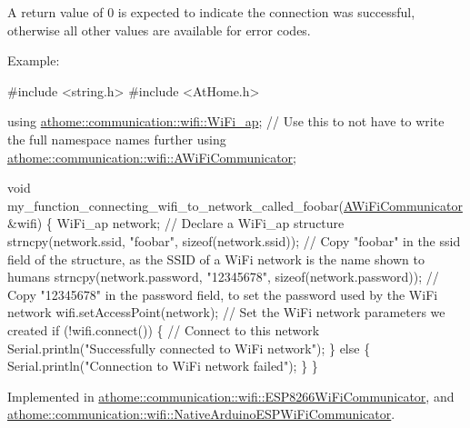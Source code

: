 A return value of 0 is expected to indicate the connection was successful, otherwise all other values are available for error codes.

Example\+:


\begin{DoxyCode}
\textcolor{preprocessor}{#include <string.h>}
\textcolor{preprocessor}{#include <AtHome.h>}

\textcolor{keyword}{using} \mbox{\hyperlink{structathome_1_1communication_1_1wifi_1_1s__wifi__access__point}{athome::communication::wifi::WiFi\_ap}}; \textcolor{comment}{// Use this to not have to
       write the full namespace names further}
\textcolor{keyword}{using} \mbox{\hyperlink{classathome_1_1communication_1_1wifi_1_1_a_wi_fi_communicator}{athome::communication::wifi::AWiFiCommunicator}};

\textcolor{keywordtype}{void} my\_function\_connecting\_wifi\_to\_network\_called\_foobar(\mbox{\hyperlink{classathome_1_1communication_1_1wifi_1_1_a_wi_fi_communicator_a0098148fe8d0eeee99b7f8f72a72a900}{AWiFiCommunicator}} &wifi) \{
  WiFi\_ap network; \textcolor{comment}{// Declare a WiFi\_ap structure}
  strncpy(network.ssid, \textcolor{stringliteral}{"foobar"}, \textcolor{keyword}{sizeof}(network.ssid)); \textcolor{comment}{// Copy "foobar" in the ssid field of the
       structure, as the SSID of a WiFi network is the name shown to humans}
  strncpy(network.password, \textcolor{stringliteral}{"12345678"}, \textcolor{keyword}{sizeof}(network.password)); \textcolor{comment}{// Copy "12345678" in the password
       field, to set the password used by the WiFi network}
  wifi.setAccessPoint(network); \textcolor{comment}{// Set the WiFi network parameters we created}
  \textcolor{keywordflow}{if} (!wifi.connect()) \{ \textcolor{comment}{// Connect to this network}
    Serial.println(\textcolor{stringliteral}{"Successfully connected to WiFi network"});
  \} \textcolor{keywordflow}{else} \{
    Serial.println(\textcolor{stringliteral}{"Connection to WiFi network failed"});
  \}
\}
\end{DoxyCode}
 

Implemented in \mbox{\hyperlink{classathome_1_1communication_1_1wifi_1_1_e_s_p8266_wi_fi_communicator_a58cc439be2f368b346bbbe1601a9b675}{athome\+::communication\+::wifi\+::\+E\+S\+P8266\+Wi\+Fi\+Communicator}}, and \mbox{\hyperlink{classathome_1_1communication_1_1wifi_1_1_native_arduino_e_s_p_wi_fi_communicator_abc07f2d953fa91f86b8919858e10bbd7}{athome\+::communication\+::wifi\+::\+Native\+Arduino\+E\+S\+P\+Wi\+Fi\+Communicator}}.

